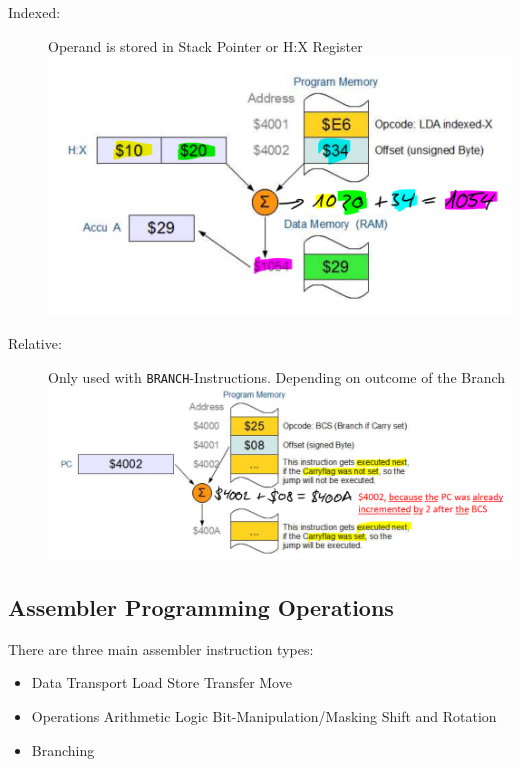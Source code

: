 \documentclass[a4paper, 11pt, nofootinbib]{book}
\newcommand{\code}[1]{\texttt{#1}}
\begin{document}
\begin{description}
	\item[Indexed: ] Operand is stored in Stack Pointer or H:X Register \\
		\includegraphics[keepaspectratio=true, height=10\baselineskip]{indAdd.PNG}
	\item[Relative: ] Only used with \code{BRANCH}-Instructions. Depending on outcome of the Branch \\
		\includegraphics[keepaspectratio=true, height=10\baselineskip]{relAdd.PNG}
\end{description}

\newpage

\subsection{Assembler Programming Operations}
There are three main assembler instruction types:

\begin{itemize}
	\item Data Transport
		\subitem Load
		\subitem Store
		\subitem Transfer
		\subitem Move
	\item Operations
		\subitem Arithmetic
		\subitem Logic
		\subitem Bit-Manipulation/Masking
		\subitem Shift and Rotation
	\item Branching
\end{itemize}
\end{document}
